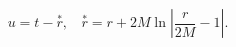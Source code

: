 \begin{equation}
u=t-\stackrel{*}{r},~~~~\stackrel{*}{r}=r+2M\ln|\frac{r}{2M}-1|.
\label{2}\end{equation} 
